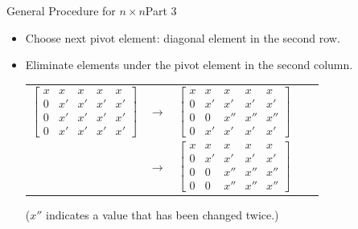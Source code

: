 \documentclass[10pt]{beamer}
\begin{document}
\begin{frame}{General Procedure for $n\times n$}{Part 3}
\begin{itemize}
    \item[4.] Choose next pivot element: diagonal element in the second row.
    \item[5.] Eliminate elements under the pivot element in the second column.
\begin{center}
	\renewcommand{\arraystretch}{1.3}
	\footnotesize
	\begin{tabular}{ccccc}
		$\begin{bmatrix} x &   x        & x & x & x    \\
						 0 & \boxed{x'} & x' & x' & x' \\
						 0 &   x'       & x' & x' & x' \\
						 0 &   x'       & x' & x' & x' \end{bmatrix}$
		& $\longrightarrow$ &
		$\begin{bmatrix} x &   x        & x   & x   & x   \\
						 0 & \boxed{x'} & x'  & x'  & x'  \\
						 0 &   0        & x'' & x'' & x'' \\
						 0 &   x'       & x'  & x'  & x'\end{bmatrix}$ \\[30pt]
		& $\longrightarrow$ &
		$\begin{bmatrix} x &   x        & x   & x   & x   \\
						 0 & \boxed{x'} & x'  & x'  & x'  \\
						 0 &   0        & x'' & x'' & x'' \\
						 0 &   0        & x'' & x'' & x'' \end{bmatrix}$
	\end{tabular}
\end{center}
    ($x''$ indicates a value that has been changed twice.)
\end{itemize}

\end{frame}
\end{document}
